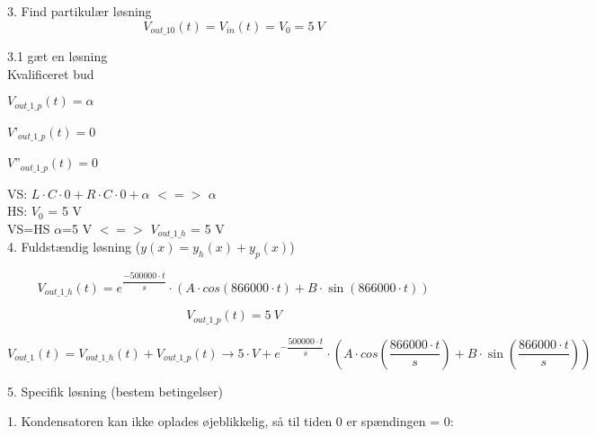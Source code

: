 3. Find partikulær løsning
\begin{equation}
	V_{out\_10}  \left(t\right)  = V_{in}  \left(t\right)  = V_{0} = 5\ V
\end{equation}

3.1 gæt en løsning \\

Kvalificeret bud
\begin{center}
\begin{minipage}{.2\linewidth}$V_{out\_1\_p}  \left(t\right)  = \alpha$
\end{minipage}
\begin{minipage}{.2\linewidth}
$V$'$_{out\_1\_p}  \left(t\right) = 0$
\end{minipage}
\begin{minipage}{.2\linewidth}
$V$''$_{out\_1\_p}  \left(t\right)  = 0$
\end{minipage}
\end{center}

VS: $L\cdot C\cdot 0 + R\cdot C\cdot 0 + \alpha$ $<=>$ $\alpha$ \\

HS: $V_0$ = 5 V \\

VS=HS $\alpha$=5 V $<=>$ $V_{out\_1\_h}$ = 5 V \\

4. Fuldstændig løsning ($y(x) = y_h(x)+y_p(x)$)

\begin{equation}
	V_{out\_1\_h}  \left(t\right)  = e^{\dfrac{ -500000\cdot t}{s}}\cdot  \left(A\cdot cos  \left(866000\cdot t\right) +B\cdot \sin  \left(866000\cdot t\right) \right) 
\end{equation}

\begin{equation}
	V_{out\_1\_p} \left(t\right)  = 5\ V
	\label{Partikulær1K}
\end{equation}

\begin{equation}
	V_{out\_1} \left(t\right)  = V_{out\_1\_h}  \left(t\right) +V_{out\_1\_p}  \left(t\right)  \xrightarrow{} 5\cdot V+e^{ -\dfrac{500000\cdot t}{s}}\cdot  \left(A\cdot cos  \left(\dfrac{866000\cdot t}{s}\right) +B\cdot \sin  \left(\dfrac{866000\cdot t}{s}\right) \right) 
\end{equation}

5. Specifik løsning (bestem betingelser)

1. Kondensatoren kan ikke oplades øjeblikkelig, så til tiden 0 er spændingen = 0: \\

